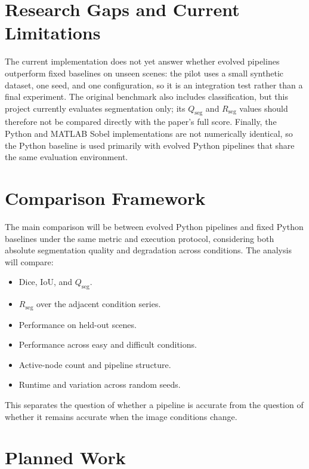 \documentclass[11pt,a4paper]{article}
\begin{document}
\section{Research Gaps and Current Limitations}

The current implementation does not yet answer whether evolved pipelines outperform fixed baselines on unseen scenes: the pilot uses a small synthetic dataset, one seed, and one configuration, so it is an integration test rather than a final experiment. The original benchmark also includes classification, but this project currently evaluates segmentation only; its $Q_{\mathrm{seg}}$ and $R_{\mathrm{seg}}$ values should therefore not be compared directly with the paper's full score. Finally, the Python and MATLAB Sobel implementations are not numerically identical, so the Python baseline is used primarily with evolved Python pipelines that share the same evaluation environment.

\section{Comparison Framework}

The main comparison will be between evolved Python pipelines and fixed Python baselines under the same metric and execution protocol, considering both absolute segmentation quality and degradation across conditions. The analysis will compare:

\begin{itemize}
    \item Dice, IoU, and $Q_{\mathrm{seg}}$.
    \item $R_{\mathrm{seg}}$ over the adjacent condition series.
    \item Performance on held-out scenes.
    \item Performance across easy and difficult conditions.
    \item Active-node count and pipeline structure.
    \item Runtime and variation across random seeds.
\end{itemize}

This separates the question of whether a pipeline is accurate from the question of whether it remains accurate when the image conditions change.

\section{Planned Work}
\label{sec:planned}
\end{document}
